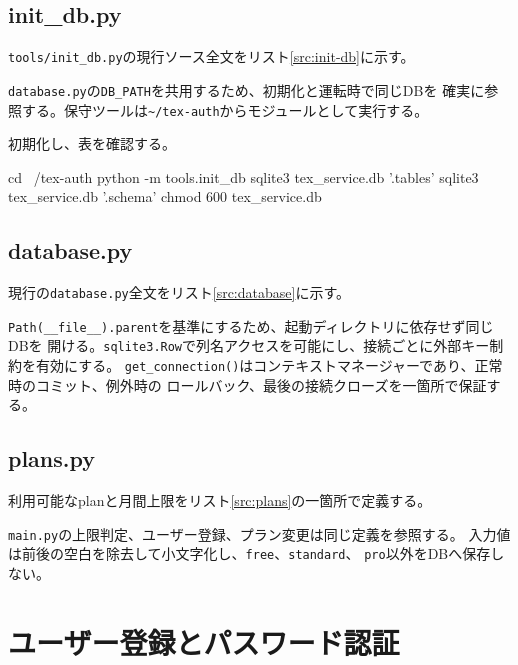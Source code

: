 \documentclass[uplatex,dvipdfmx,a4paper,11pt]{jsarticle}
\begin{document}
\subsection{init\_db.py}

\texttt{tools/init\_db.py}の現行ソース全文をリスト\ref{src:init-db}に示す。



\texttt{database.py}の\texttt{DB\_PATH}を共用するため、初期化と運転時で同じDBを
確実に参照する。保守ツールは\texttt{\~{}/tex-auth}からモジュールとして実行する。

初期化し、表を確認する。

\begin{command}
cd ~/tex-auth
python -m tools.init_db
sqlite3 tex_service.db '.tables'
sqlite3 tex_service.db '.schema'
chmod 600 tex_service.db
\end{command}

\subsection{database.py}

現行の\texttt{database.py}全文をリスト\ref{src:database}に示す。



\texttt{Path(\_\_file\_\_).parent}を基準にするため、起動ディレクトリに依存せず同じDBを
開ける。\texttt{sqlite3.Row}で列名アクセスを可能にし、接続ごとに外部キー制約を有効にする。
\texttt{get\_connection()}はコンテキストマネージャーであり、正常時のコミット、例外時の
ロールバック、最後の接続クローズを一箇所で保証する。

\subsection{plans.py}

利用可能なplanと月間上限をリスト\ref{src:plans}の一箇所で定義する。



\texttt{main.py}の上限判定、ユーザー登録、プラン変更は同じ定義を参照する。
入力値は前後の空白を除去して小文字化し、\texttt{free}、\texttt{standard}、
\texttt{pro}以外をDBへ保存しない。

\section{ユーザー登録とパスワード認証}
\end{document}
